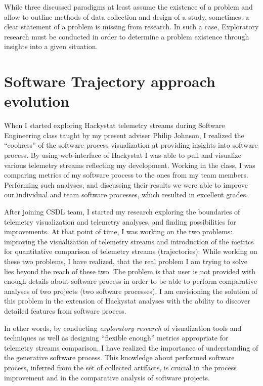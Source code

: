 While three discussed paradigms at least assume the existence of a problem and allow to outline methods of data collection and design of a study, sometimes, a clear statement of a problem is missing from research. In such a case, Exploratory research must be conducted in order to determine a problem existence through insights into a given situation.

\section{Software Trajectory approach evolution}
When I started exploring Hackystat telemetry streams during Software Engineering class taught by my present adviser Philip Johnson, I realized the ``coolness'' of the software process visualization at providing insights into software process. By using web-interface of Hackystat I was able to pull and visualize various telemetry streams reflecting my development. Working in the class, I was comparing metrics of my software process to the ones from my team members. Performing such analyses, and discussing their results we were able to improve our individual and team software processes, which resulted in excellent grades. 

After joining CSDL team, I started my research exploring the boundaries of telemetry visualization and telemetry analyses, and finding possibilities for improvements. At that point of time, I was working on the two problems: improving the visualization of telemetry streams and introduction of the metrics for quantitative comparison of telemetry streams (trajectories). While working on these two problems, I have realized, that the real problem I am trying to solve lies beyond the reach of these two. The problem is that user is not provided with enough details about software process in order to be able to perform comparative analyses of two projects (two software processes). I am envisioning the solution of this problem in the extension of Hackystat analyses with the ability to discover detailed features from software process.

In other words, by conducting \textit{exploratory research} of visualization tools and techniques as well as designing ``flexible enough'' metrics appropriate for telemetry streams comparison, I have realized the importance of understanding of the generative software process. This knowledge about performed software process, inferred from the set of collected artifacts, is crucial in the process improvement and in the comparative analysis of software projects.

